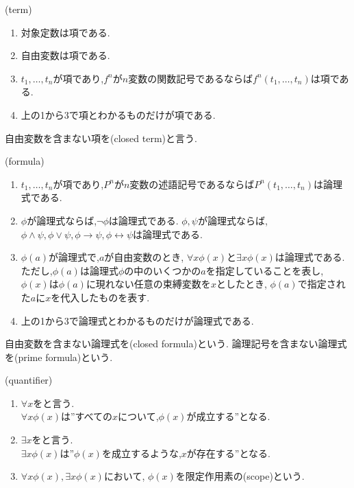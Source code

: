 \begin{dfn}
 (term)
 \begin{enumerate}
  \item 対象定数は項である.
  \item 自由変数は項である.
  \item $t_1,\dots,t_n$が項であり,$f^n$が$n$変数の関数記号であるならば$f^n(t_1,\dots,t_n)$は項である.
  \item 上の1から3で項とわかるものだけが項である.
 \end{enumerate}
\end{dfn}

自由変数を含まない項を(closed term)と言う.

\begin{dfn}
 (formula)
 \begin{enumerate}
  \item $t_1,\dots,t_n$が項であり,$P^n$が$n$変数の述語記号であるならば$P^n(t_1,\dots,t_n)$は論理式である.
  \item $\phi$が論理式ならば,$\lnot \phi$は論理式である. \newline
		$\phi,\psi$が論理式ならば, $\phi \land \psi, \phi \lor \psi, \phi \to \psi, \phi \leftrightarrow \psi$は論理式である.
  \item $\phi(a)$が論理式で,$a$が自由変数のとき, $\forall x \phi(x)$と$\exists x \phi(x)$は論理式である.
		ただし,$\phi(a)$は論理式$\phi$の中のいくつかの$a$を指定していることを表し,
		$\phi(x)$は$\phi(a)$に現れない任意の束縛変数を$x$としたとき, $\phi(a)$で指定された$a$に$x$を代入したものを表す.
  \item 上の1から3で論理式とわかるものだけが論理式である.
 \end{enumerate}
\end{dfn}

自由変数を含まない論理式を(closed formula)という.
論理記号を含まない論理式を(prime formula)という.

\begin{dfn}
 (quantifier)
 \begin{enumerate}
  \item $\forall x$をと言う.\\
		$\forall x \phi(x)$は''すべての$x$について,$\phi(x)$が成立する''となる.
  \item $\exists x$をと言う. \\
		$\exists x \phi(x)$は''$\phi(x)$を成立するような,$x$が存在する''となる.
  \item $\forall x \phi(x),\exists x \phi(x)$において,
		$\phi(x)$を限定作用素の(scope)という.
 \end{enumerate}
\end{dfn}

